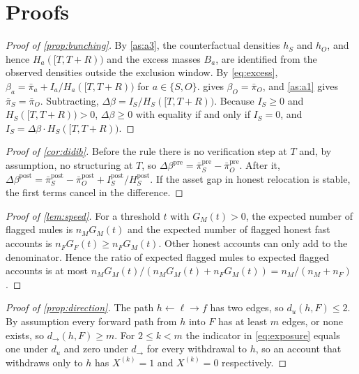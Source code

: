 \section{Proofs}\label{app:proofs}

\begin{proof}[Proof of \cref{prop:bunching}]
By \cref{as:a3}, the counterfactual densities $h_S$ and $h_O$, and hence $H_a([T,T+R))$ and the excess masses $B_a$,
are identified from the observed densities outside the exclusion window. By \cref{eq:excess},
$\beta_a=\bar\pi_a+I_a/H_a([T,T+R))$ for $a\in\{S,O\}$.  gives $\beta_O=\bar\pi_O$, and \cref{as:a1} gives
$\bar\pi_S=\bar\pi_O$. Subtracting, $\Delta\beta=I_S/H_S([T,T+R))$. Because $I_S\geq0$ and $H_S([T,T+R))>0$,
$\Delta\beta\geq0$ with equality if and only if $I_S=0$, and $I_S=\Delta\beta\cdot H_S([T,T+R))$.
\end{proof}

\begin{proof}[Proof of \cref{cor:didib}]
Before the rule there is no verification step at $T$ and, by assumption, no structuring at $T$, so
$\Delta\beta^{\text{pre}}=\bar\pi_S^{\text{pre}}-\bar\pi_O^{\text{pre}}$. After it,
$\Delta\beta^{\text{post}}=\bar\pi_S^{\text{post}}-\bar\pi_O^{\text{post}}+I_S^{\text{post}}/H_S^{\text{post}}$.
If the asset gap in honest relocation is stable, the first terms cancel in the difference.
\end{proof}

\begin{proof}[Proof of \cref{lem:speed}]
For a threshold $t$ with $G_M(t)>0$, the expected number of flagged mules is $n_MG_M(t)$ and the expected number of
flagged honest fast accounts is $n_FG_F(t)\geq n_FG_M(t)$. Other honest accounts can only add to the denominator. Hence
the ratio of expected flagged mules to expected flagged accounts is at most
$n_MG_M(t)/\left(n_MG_M(t)+n_FG_M(t)\right)=n_M/(n_M+n_F)$.
\end{proof}

\begin{proof}[Proof of \cref{prop:direction}]
The path $h\leftarrow\ell\rightarrow f$ has two edges, so $d_u(h,F)\leq2$. By assumption every forward path from $h$ into
$F$ has at least $m$ edges, or none exists, so $d_\to(h,F)\geq m$. For $2\leq k<m$ the indicator in \cref{eq:exposure}
equals one under $d_u$ and zero under $d_\to$ for every withdrawal to $h$, so an account that withdraws only to $h$ has
$X^{(k)}=1$ and $X^{(k)}=0$ respectively.
\end{proof}

